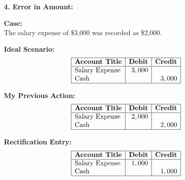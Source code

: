 \documentclass[12pt,a4paper]{book}
\begin{document}
\textbf{4. Error in Amount:}
\begin{multicols}{2}
    
    \textbf{Case:} \\
    The salary expense of \$3,000 was recorded as \$2,000.

    \textbf{Ideal Scenario:}
    \[
\begin{array}{|l|r|r|}
\hline
\textbf{Account Title} & \textbf{Debit} & \textbf{Credit} \\
\hline
\text{Salary Expense} & 3,000 & \\
\text{Cash} & & 3,000 \\
\hline
\end{array}
\]

\textbf{My Previous Action:}
\[
\begin{array}{|l|r|r|}
\hline
\textbf{Account Title} & \textbf{Debit} & \textbf{Credit} \\
\hline
\text{Salary Expense} & 2,000 & \\
\text{Cash} & & 2,000 \\
\hline
\end{array}
\]

\textbf{Rectification Entry:}
\[
\begin{array}{|l|r|r|}
\hline
\textbf{Account Title} & \textbf{Debit} & \textbf{Credit} \\
\hline
\text{Salary Expense} & 1,000 & \\
\text{Cash} & & 1,000 \\
\hline
\end{array}
\]
\end{multicols}

\vspace{0.5cm}
\end{document}
